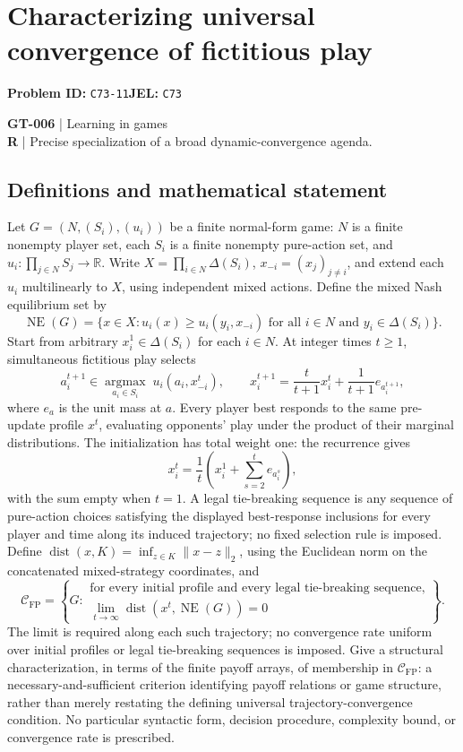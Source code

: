 \documentclass[11pt,a4paper]{article}
\newcommand{\R}{\mathbb R}
\begin{document}
\section*{Characterizing universal convergence of fictitious play}
\textbf{Problem ID:} \texttt{C73-11}\quad \textbf{JEL:} \texttt{C73}\par
\label{problem:OP-0136}
\label{game:GT-006}
{\sffamily\small\color{muted}
\textbf{GT-006} | Learning in games\\
\textbf{R} | Precise specialization of a broad dynamic-convergence agenda.
\par}
\subsection*{Definitions and mathematical statement}
Let $G=(N,(S_i),(u_i))$ be a finite normal-form game: $N$ is a finite nonempty player set, each $S_i$ is a finite nonempty pure-action set, and $u_i:\prod_{j\in N}S_j\to\R$. Write $X=\prod_{i\in N}\Delta(S_i)$, $x_{-i}=(x_j)_{j\ne i}$, and extend each $u_i$ multilinearly to $X$, using independent mixed actions. Define the mixed Nash equilibrium set by
\[
 \operatorname{NE}(G)=\{x\in X:
 u_i(x)\geq u_i(y_i,x_{-i})
 \text{ for all }i\in N\text{ and }y_i\in\Delta(S_i)\}.
\]
Start from arbitrary $x_i^1\in\Delta(S_i)$ for each $i\in N$. At integer times $t\geq1$, simultaneous fictitious play selects
\[
 a_i^{t+1}\in\underset{a_i\in S_i}{\operatorname{argmax}}\;
 u_i(a_i,x_{-i}^{t}),\qquad
 x_i^{t+1}=\frac{t}{t+1}x_i^t+\frac1{t+1}e_{a_i^{t+1}},
\]
where $e_a$ is the unit mass at $a$. Every player best responds to the same pre-update profile $x^t$, evaluating opponents' play under the product of their marginal distributions. The initialization has total weight one: the recurrence gives
\[
 x_i^t=\frac1t\left(x_i^1+\sum_{s=2}^t e_{a_i^s}\right),
\]
with the sum empty when $t=1$. A legal tie-breaking sequence is any sequence of pure-action choices satisfying the displayed best-response inclusions for every player and time along its induced trajectory; no fixed selection rule is imposed. Define $\operatorname{dist}(x,K)=\inf_{z\in K}\|x-z\|_2$, using the Euclidean norm on the concatenated mixed-strategy coordinates, and
\[
 \mathcal C_{\mathrm{FP}}=\left\{G:
 \begin{array}{l}
 \text{for every initial profile and every legal tie-breaking sequence,}\\
 \displaystyle\lim_{t\to\infty}\operatorname{dist}(x^t,\operatorname{NE}(G))=0
 \end{array}\right\}.
\]
The limit is required along each such trajectory; no convergence rate uniform over initial profiles or legal tie-breaking sequences is imposed.
Give a structural characterization, in terms of the finite payoff arrays,
of membership in $\mathcal C_{\mathrm{FP}}$: a necessary-and-sufficient
criterion identifying payoff relations or game structure, rather than
merely restating the defining universal trajectory-convergence condition.
No particular syntactic form, decision procedure, complexity bound, or
convergence rate is prescribed.
\end{document}
